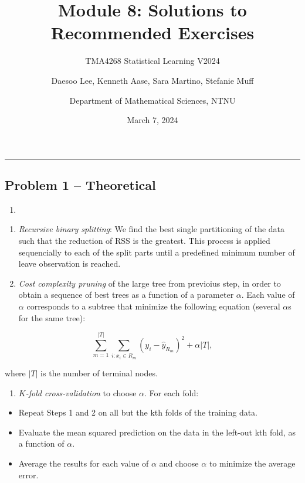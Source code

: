\documentclass[
]{article}
\title{Module 8: Solutions to Recommended Exercises}
\subtitle{TMA4268 Statistical Learning V2024}
\author{Daesoo Lee, Kenneth Aase, Sara Martino, Stefanie
Muff \and Department of Mathematical Sciences, NTNU}
\date{March 7, 2024}
\providecommand{\tightlist}{%
  \setlength{\itemsep}{0pt}\setlength{\parskip}{0pt}}
\begin{document}
\maketitle

\begin{center}\rule{0.5\linewidth}{0.5pt}\end{center}

\hypertarget{problem-1-theoretical}{%
\subsection{Problem 1 -- Theoretical}\label{problem-1-theoretical}}

\begin{enumerate}
\def\labelenumi{\alph{enumi})}
\tightlist
\item
\end{enumerate}

\begin{enumerate}
\def\labelenumi{\arabic{enumi}.}
\item
  \emph{Recursive binary splitting}: We find the best single
  partitioning of the data such that the reduction of RSS is the
  greatest. This process is applied sequencially to each of the split
  parts until a predefined minimum number of leave observation is
  reached.
\item
  \emph{Cost complexity pruning} of the large tree from previoius step,
  in order to obtain a sequence of best trees as a function of a
  parameter \(\alpha\). Each value of \(\alpha\) corresponds to a
  subtree that minimize the following equation (several \(\alpha\)s for
  the same tree):
\end{enumerate}

\[\sum_{m=1}^{|T|}\sum_{i:x_i\in R_m}(y_i - \hat y_{R_m})^2 + \alpha |T|,\]

where \(|T|\) is the number of terminal nodes.

\begin{enumerate}
\def\labelenumi{\arabic{enumi}.}
\setcounter{enumi}{2}
\tightlist
\item
  \emph{\(K\)-fold cross-validation} to choose \(\alpha\). For each
  fold:
\end{enumerate}

\begin{itemize}
\tightlist
\item
  Repeat Steps 1 and 2 on all but the kth folds of the training data.
\item
  Evaluate the mean squared prediction on the data in the left-out kth
  fold, as a function of \(\alpha\).
\item
  Average the results for each value of \(\alpha\) and choose \(\alpha\)
  to minimize the average error.
\end{itemize}
\end{document}
